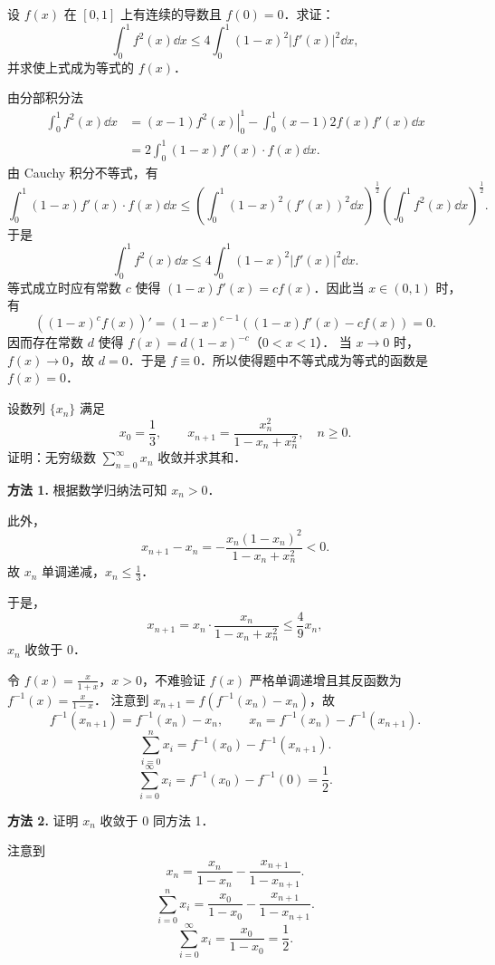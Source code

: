 设 $f(x)$ 在 $[0,1]$ 上有连续的导数且 $f(0)=0$．求证：
\[
\int_0^1 f^2(x)\dd x\le4\int_0^1(1-x)^2|f'(x)|^2\dd x,
\]
并求使上式成为等式的 $f(x)$．
\begin{solution}
由分部积分法
\begin{align*}
\int_0^1 f^2(x)\dd x
&=\left.(x-1)f^2(x)\right|_0^1-\int_0^1(x-1)2f(x)f'(x)\dd x\\
&=2\int_0^1(1-x)f'(x)\cdot f(x)\dd x.
\end{align*}
由 Cauchy 积分不等式，有
\[
\int_0^1(1-x)f'(x)\cdot f(x)\dd x
\le\left(\int_0^1(1-x)^2(f'(x))^2\dd x\right)^{\frac{1}{2}}
\left(\int_0^1 f^2(x)\dd x\right)^{\frac{1}{2}}.
\]
于是
\[
\int_0^1 f^2(x)\dd x\le4\int_0^1(1-x)^2|f'(x)|^2\dd x.
\]
等式成立时应有常数 $c$ 使得 $(1-x)f'(x)=cf(x)$．因此当 $x\in(0,1)$ 时，有
\[
\left((1-x)^cf(x)\right)'
=(1-x)^{c-1}\left((1-x)f'(x)-cf(x)\right)=0.
\]
因而存在常数 $d$ 使得 $f(x)=d(1-x)^{-c}$（$0<x<1$）．
当 $x\to0$ 时，$f(x)\to0$，故 $d=0$．于是 $f\equiv0$．所以使得题中不等式成为等式的函数是 $f(x)=0$．
\end{solution}

设数列 $\{x_n\}$ 满足
\[
x_0=\frac{1}{3},\qquad x_{n+1}=\frac{x_n^2}{1-x_n+x_n^2},\quad n\ge0.
\]
证明：无穷级数 $\displaystyle \sum_{n=0}^{\infty}x_n$ 收敛并求其和．
\begin{solution}
\textbf{方法 1.} 根据数学归纳法可知 $x_n>0$．

此外，
\[
x_{n+1}-x_n=-\frac{x_n(1-x_n)^2}{1-x_n+x_n^2}<0.
\]
故 $x_n$ 单调递减，$x_n\le\frac{1}{3}$．

于是，
\[
x_{n+1}=x_n\cdot\frac{x_n}{1-x_n+x_n^2}\le\frac{4}{9}x_n,
\]
$x_n$ 收敛于 $0$．

令 $f(x)=\frac{x}{1+x}$，$x>0$，不难验证 $f(x)$ 严格单调递增且其反函数为 $f^{-1}(x)=\frac{x}{1-x}$．
注意到 $x_{n+1}=f\left(f^{-1}(x_n)-x_n\right)$，故
\[
f^{-1}(x_{n+1})=f^{-1}(x_n)-x_n,\qquad
x_n=f^{-1}(x_n)-f^{-1}(x_{n+1}).
\]
\[
\sum_{i=0}^n x_i=f^{-1}(x_0)-f^{-1}(x_{n+1}).
\]
\[
\sum_{i=0}^{\infty}x_i=f^{-1}(x_0)-f^{-1}(0)=\frac{1}{2}.
\]

\textbf{方法 2.} 证明 $x_n$ 收敛于 $0$ 同方法 1．

注意到
\[
x_n=\frac{x_n}{1-x_n}-\frac{x_{n+1}}{1-x_{n+1}}.
\]
\[
\sum_{i=0}^n x_i=\frac{x_0}{1-x_0}-\frac{x_{n+1}}{1-x_{n+1}}.
\]
\[
\sum_{i=0}^{\infty}x_i=\frac{x_0}{1-x_0}=\frac{1}{2}.
\]
\end{solution}

